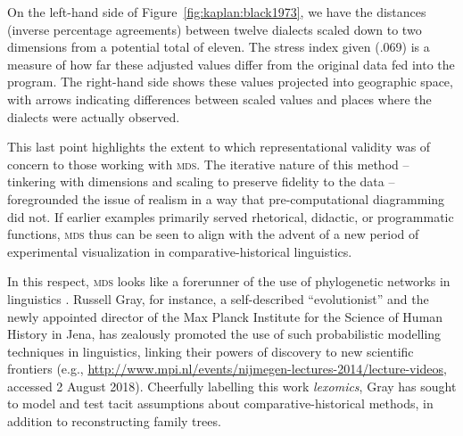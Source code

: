\documentclass[output=paper]{langscibook}
\begin{document}
On the left-hand side of Figure~\ref{fig:kaplan:black1973}, we have the distances (inverse percentage agreements) between twelve dialects scaled down to two dimensions from a potential total of eleven. The stress index given (.069) is a measure of how far these adjusted values differ from the original data fed into the program. The right-hand side shows these values projected into geographic space, with arrows indicating differences between scaled values and places where the dialects were actually observed.

This last point highlights the extent to which representational validity was of concern to those working with \textsc{mds}. The iterative nature of this method -- tinkering with dimensions and scaling to preserve fidelity to the data -- foregrounded the issue of realism in a way that pre-computational diagramming did not. If earlier examples primarily served rhetorical, didactic, or programmatic functions, \textsc{mds} thus can be seen to align with the advent of a new period of experimental visualization in comparative-historical linguistics.

In this respect, \textsc{mds} looks like a forerunner of the use of phylogenetic networks in linguistics \citep{Stevens2013}. Russell Gray, for instance, a self-described ``evolutionist'' and the newly appointed director of the Max Planck Institute for the Science of Human History in Jena, has zealously promoted the use of such probabilistic modelling techniques in linguistics, linking their powers of discovery to new scientific frontiers (e.g., \url{http://www.mpi.nl/events/nijmegen-lectures-2014/lecture-videos}, accessed 2 August 2018). Cheerfully labelling this work \emph{lexomics}, Gray has sought to model and test tacit assumptions about comparative-historical methods, in addition to reconstructing family trees.
\end{document}
